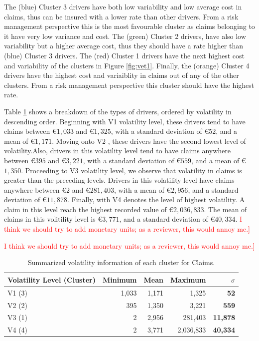 \documentclass[11pt,letterpaper]{article}
\numberwithin{equation}{section}
\numberwithin{equation}{section}
\numberwithin{equation}{section}
\begin{document}
The (blue) Cluster 3 drivers have both low variability and low average cost in claims, thus can be insured with a lower rate than other drivers. From a risk management perspective this is the most favourable cluster as claims belonging to it have very low variance and cost. The (green) Cluster 2  drivers, have also low variability but a higher average cost, thus they should have a rate higher than (blue) Cluster 3  drivers. The (red) Cluster 1  drivers have the next highest cost and variability of the clusters in Figure \ref{fig:vet1}. Finally, the (orange) Cluster 4  drivers have the highest cost and variaiblity in claims out of any of the other clusters. From a risk management perspective this cluster should have the highest rate.


Table \ref{table:volSev} shows a breakdown of the types of drivers, ordered by volatility in descending order. Beginning with V1 volatility level, these drivers tend to have claims between \euro$1,033$ and  \euro$1,325$, with a standard deviation of  \euro$52$, and a mean of  \euro$1,171$. Moving onto V2 , these drivers have the second lowest level of volatility.Also, drivers in this volatility level tend to have claims anywhere between  \euro$395$ and  \euro$3,221$, with a standard deviation of  \euro$559$, and a mean of  \euro$1,350$.  Proceeding to V3 volatility level, we observe that volatility in claims is greater than the preceding levels. Drivers in this volatility level have claims anywhere between  \euro$2$ and \euro$281,403$, with a mean of  \euro$2,956$, and a standard deviation of  \euro$11,878$. Finally, with V4 denotes the level of highest volatility. A claim in this level reach the highest recorded value of  \euro$2,036,833$. The mean of  claims in this volitility level is \euro$3,771$, and a standard deviation of  \euro$40,334$. \textcolor{red}{I think we should try to add monetary units; as a reviewer, this would annoy me.]}

 \textcolor{red}{I think we should try to add monetary units; as a reviewer, this would annoy me.]}
 
\begin{table}[!htb]
\centering
\caption{Summarized volatility information of each cluster for Claims.}
\label{table:volSev}
\begin{tabular}{lrrrr}
\hline
Volatility Level (Cluster)     & Minimum & Mean  & Maximum & $\sigma$    \\
\hline
V1 (3) & 1,033 & 1,171 & 1,325 & \textbf{52} \\
V2 (2) & 395 & 1,350 & 3,221 & \textbf{559} \\
V3 (1) & 2 & 2,956 & 281,403 & \textbf{11,878 }\\
V4 (4) & 2 & 3,771 & 2,036,833 & \textbf{ 40,334 } \\ 
\hline
\end{tabular}
\end{table}
\end{document}
